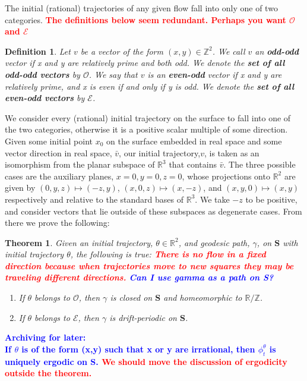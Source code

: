 \documentclass[]{article}
\newtheorem*{thm*}{Theorem}
\newtheorem*{def*}{Definition}
\newcommand{\compav}[1]{\textbf{\textcolor{blue}{#1}}}
\newcommand{\compat}[1]{\textbf{\textcolor{red}{#1}}}
\begin{document}
The initial (rational) trajectories of any given flow fall into only one of two categories.
\compat{The definitions below seem redundant. Perhaps you want ${\mathcal O}$ and ${\mathcal E}$}

\begin{def*}
Let $v$ be a vector of the form $(x,y)\in\mathbb{Z}^{2}$. We call $v$ an \textbf{odd-odd} vector if x and y are relatively prime and both odd. We denote the \textbf{set of all odd-odd vectors} by $\mathcal{O}$. We say that $v$ is an  \textbf{even-odd} vector if x and y are relatively prime, and x is even if and only if y is odd. We denote the \textbf{set of all even-odd vectors} by $\mathcal{E}$.
\end{def*}

We consider every (rational) initial trajectory on the surface to fall into one of the two categories, otherwise it is a positive scalar multiple of some direction. Given some initial point $x_{0}$ on the surface embedded in real space and some vector direction in real space, $\bar{v}$, our initial trajectory,$v$, is taken as an isomorphism from the planar subspace of $\mathbb{R}^{3}$ that contains $\bar{v}$. The three possible cases are the auxiliary planes, $x=0, y=0, z=0$, whose projections onto $\mathbb{R}^{2}$ are given by $(0,y,z)\mapsto(-z,y)$, $(x,0,z)\mapsto(x,-z)$, and $(x,y,0)\mapsto(x,y)$ respectively and relative to the standard bases of $\mathbb{R}^{3}$. We take $-z$ to be positive, and consider vectors that lie outside of these subspaces as degenerate cases. From there we prove the following:

\begin{thm*}{Given an initial trajectory, $\theta\in\mathbb{R}^{2}$, and geodesic path, $\gamma$, on $\mathbf{S}$ with initial trajectory $\theta$, the following is true:} \compat{There is no flow in a fixed direction because when trajectories move to new squares they may be traveling different directions.}
\compav{Can I use gamma as a path on S?}
\begin{enumerate}[label=(\roman*)]
\item If $\theta$ belongs to $\mathcal{O}$, then $\gamma$ is closed on $\mathbf{S}$ and homeomorphic to $\mathbb{R}/\mathbb{Z}$.
\item If $\theta$ belongs to $\mathcal{E}$, then $\gamma$ is drift-periodic on $\mathbf{S}$.

\end{enumerate}
\end{thm*}

\compav{Archiving for later:\\If $\theta$ is of the form (x,y) such that x or y are irrational, then $\phi^{\theta}_{t}$ is uniquely ergodic on $\mathbf{S}$. \compat{We should move the discussion of ergodicity outside the theorem.}	}
\end{document}
